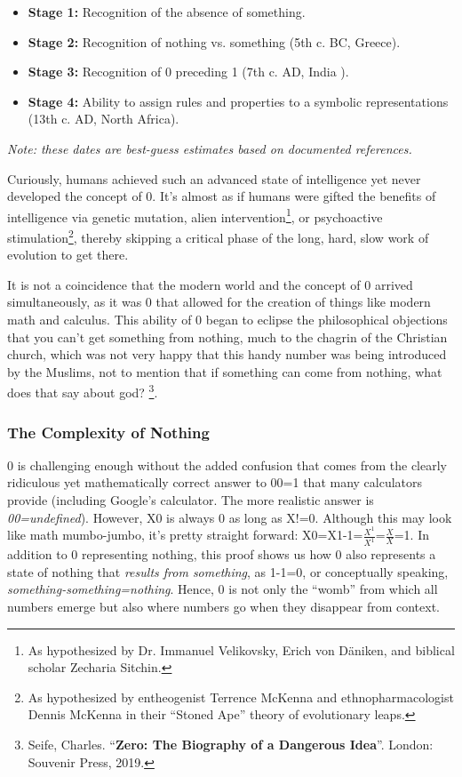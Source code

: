 \documentclass[
]{article}
\begin{document}
\begin{itemize}
\item
  \textbf{Stage 1:} Recognition of the absence of something.
\item
  \textbf{Stage 2:} Recognition of nothing vs. something (5th c. BC,
  Greece).
\item
  \textbf{Stage 3:} Recognition of 0 preceding 1 (7th c. AD, India ).
\item
  \textbf{Stage 4:} Ability to assign rules and properties to a symbolic
  representations (13th c. AD, North Africa).
\end{itemize}

\emph{Note: these dates are best-guess estimates based on documented
references.}

Curiously, humans achieved such an advanced state of intelligence yet
never developed the concept of 0. It's almost as if humans were gifted
the benefits of intelligence via genetic mutation, alien
intervention\footnote{As hypothesized by Dr. Immanuel Velikovsky, Erich
  von Däniken, and biblical scholar Zecharia Sitchin.}, or psychoactive
stimulation\footnote{As hypothesized by entheogenist Terrence McKenna
  and ethnopharmacologist Dennis McKenna in their ``Stoned Ape'' theory
  of evolutionary leaps.}, thereby skipping a critical phase of the
long, hard, slow work of evolution to get there.

It is not a coincidence that the modern world and the concept of 0
arrived simultaneously, as it was 0 that allowed for the creation of
things like modern math and calculus. This ability of 0 began to eclipse
the philosophical objections that you can't get something from nothing,
much to the chagrin of the Christian church, which was not very happy
that this handy number was being introduced by the Muslims, not to
mention that if something can come from nothing, what does that say
about god? \footnote{Seife, Charles. ``\textbf{Zero: The Biography of a
  Dangerous Idea}''. London: Souvenir Press, 2019.}.

\subsubsection{The Complexity of
Nothing}\label{the-complexity-of-nothing}

0 is challenging enough without the added confusion that comes from the
clearly ridiculous yet mathematically correct answer to 00=1 that many
calculators provide (including Google's calculator. The more realistic
answer is \emph{00=undefined}). However, X0 is always 0 as long as X!=0.
Although this may look like math mumbo-jumbo, it's pretty straight
forward: X0=X1-1=\(\frac{X^1}{X^1}\)=\(\frac{X}{X}\)=1. In addition to 0
representing nothing, this proof shows us how 0 also represents a state
of nothing that \emph{results from something}, as 1-1=0, or conceptually
speaking, \emph{something-something=nothing}. Hence, 0 is not only the
``womb'' from which all numbers emerge but also where numbers go when
they disappear from context.
\end{document}
